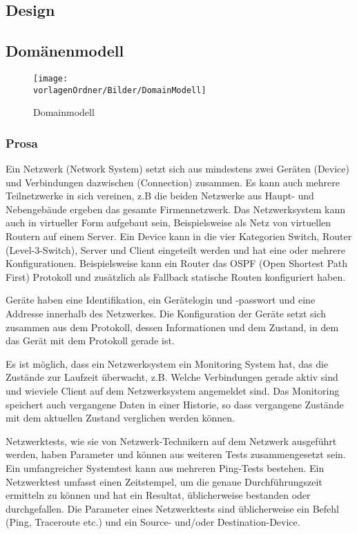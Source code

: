 \documentclass[]{subfiles}
\begin{document}
\begin{landscape}
    \section{Design}
	\subsection{Domänenmodell}
	\begin{figure}[h!]
		\texttt{[image: \\vorlagenOrdner/Bilder/DomainModell]}
		\caption{Domainmodell}
	\end{figure}
	\newpage	
\end{landscape}


	\subsubsection{Prosa}
	Ein Netzwerk (Network System) setzt sich aus mindestens zwei Geräten (Device) und Verbindungen dazwischen (Connection) zusammen.
	Es kann auch mehrere Teilnetzwerke in sich vereinen, z.B die beiden Netzwerke aus Haupt- und Nebengebäude ergeben das gesamte Firmennetzwerk.
	Das Netzwerksystem kann auch in virtueller Form aufgebaut sein, Beispielsweise als Netz von virtuellen Routern auf einem Server.
	Ein Device kann in die vier Kategorien Switch, Router (Level-3-Switch), Server und Client eingeteilt werden und hat eine oder mehrere Konfigurationen.
	Beispielsweise kann ein Router das OSPF (Open Shortest Path First) Protokoll und zusätzlich als Fallback statische Routen konfiguriert haben.

	Geräte haben eine Identifikation, ein Gerätelogin und -passwort und eine Addresse innerhalb des Netzwerkes.
	Die Konfiguration der Geräte setzt sich zusammen aus dem Protokoll, dessen Informationen und dem Zustand, in dem das Gerät mit dem Protokoll gerade ist.

	Es ist möglich, dass ein Netzwerksystem ein Monitoring System hat, das die Zustände zur Laufzeit überwacht, z.B. Welche Verbindungen gerade aktiv sind und wieviele Client auf dem Netzwerksystem angemeldet sind.
	Das Monitoring speichert auch vergangene Daten in einer Historie, so dass vergangene Zustände mit dem aktuellen Zustand verglichen werden können.

	Netzwerktests, wie sie von Netzwerk-Technikern auf dem Netzwerk ausgeführt werden, haben Parameter und können aus weiteren Tests zusammengesetzt sein. 
	Ein umfangreicher Systemtest kann aus mehreren Ping-Tests bestehen.
	Ein Netzwerktest umfasst einen Zeitstempel, um die genaue Durchführungszeit ermitteln zu können und hat ein Resultat, üblicherweise bestanden oder durchgefallen.
	Die Parameter eines Netzwerktests sind üblicherweise ein Befehl (Ping, Traceroute etc.) und ein Source- und/oder Destination-Device.
\end{document}
